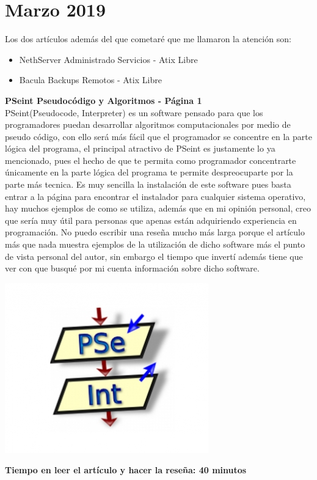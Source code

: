 \documentclass[a4paper, 11pt, oneside]{article}
\begin{document}
\section*{Marzo 2019}
Los dos artículos además del que cometaré que me llamaron la atención son:
\begin{itemize}
    \item NethServer Administrado Servicios - Atix Libre
    \item Bacula Backups Remotos - Atix Libre
\end{itemize}
\textbf{PSeint Pseudocódigo y Algoritmos - Página 1}\\
PSeint(Pseudocode, Interpreter) es un software pensado para que los programadores puedan desarrollar algoritmos computacionales por medio de pseudo código, con ello será más fácil que el programador se concentre en la parte lógica del programa, el principal atractivo de PSeint es justamente lo ya mencionado, pues el hecho de que te permita como programador concentrarte únicamente en la parte lógica del programa te permite despreocuparte por la parte más tecnica. Es muy sencilla la instalación de este software pues basta entrar a la página para encontrar el instalador para cualquier sistema operativo, hay muchos ejemplos de como se utiliza, además que en mi opinión personal, creo que sería muy útil para personas que apenas están adquiriendo experiencia en programación. No puedo escribir una reseña mucho más larga porque el artículo más que nada muestra ejemplos de la utilización de dicho software más el punto de vista personal del autor, sin embargo el tiempo que invertí además tiene que ver con que busqué por mi cuenta información sobre dicho software.
\begin{center}
    \includegraphics[scale=0.50]{pseint.png}
\end{center}
\textbf{Tiempo en leer el artículo y hacer la reseña: 40 minutos}
\end{document}
